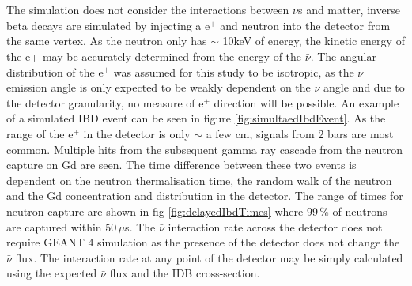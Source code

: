 \\\\The simulation does not consider the interactions between $\nu$s and matter, inverse beta decays are simulated by injecting a e$^+$ and neutron into the detector from the same vertex. As the neutron only has $\sim$ 10keV of energy, the kinetic energy of the e+ may be accurately determined from the energy of the $\bar{\nu}$. The angular distribution of the e$^+$ was assumed for this study to be isotropic, as the $\bar{\nu}$ emission angle is only expected to be weakly dependent on the $\bar{\nu}$ angle \cite{Vogel_1999} and due to the detector granularity, no measure of e$^+$ direction will be possible. An example of a simulated IBD event can be seen in figure \ref{fig:simultaedIbdEvent}. As the range of the e$^+$ in the detector is only $\sim$ a few cm, signals from 2 bars are most common. Multiple hits from the subsequent gamma ray cascade from the neutron capture on Gd are seen. The time difference between these two events is dependent on the neutron thermalisation time, the random walk of the neutron and the Gd concentration and distribution in the detector. The range of times for neutron capture are shown in fig \ref{fig:delayedIbdTimes} where 99\,\% of neutrons are captured within $50\,\mu$s. The $\bar{\nu}$ interaction rate across the detector does not require GEANT 4 simulation as the presence of the detector does not change the $\bar{\nu}$ flux. The interaction rate at any point of the detector may be simply calculated using the expected $\bar{\nu}$ flux and the IDB cross-section.

